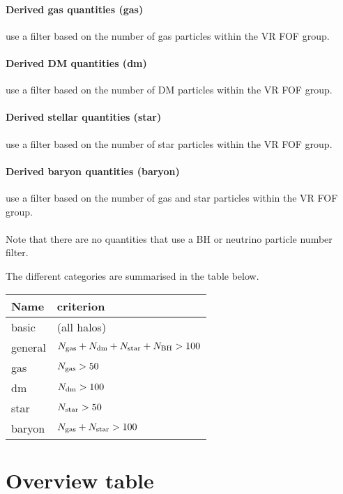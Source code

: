 \documentclass{article}
\begin{document}
\paragraph{Derived gas quantities (gas)} use a filter based on the number of gas particles within the VR FOF 
group.

\paragraph{Derived DM quantities (dm)} use a filter based on the number of DM particles within the VR FOF 
group.

\paragraph{Derived stellar quantities (star)} use a filter based on the number of star particles within the VR 
FOF group.

\paragraph{Derived baryon quantities (baryon)} use a filter based on the number of gas and star particles 
within the VR FOF group.

\paragraph{}Note that there are no quantities that use a BH or neutrino particle number filter.

The different categories are summarised in the table below.

\begin{longtable}{ll}
Name & criterion \\
\hline{}basic & (all halos) \\
general & $N_{\rm{}gas}+N_{\rm{}dm}+N_{\rm{}star}+N_{\rm{}BH} > 100$ \\
gas & $N_{\rm{}gas} > 50$ \\
dm & $N_{\rm{}dm} > 100$ \\
star & $N_{\rm{}star} > 50$ \\
baryon & $N_{\rm{}gas}+N_{\rm{}star} > 100$ \\
\end{longtable}

\section{Overview table}
\end{document}
